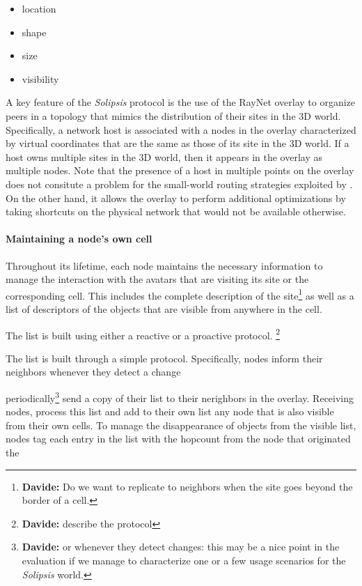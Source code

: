\documentclass{article}
\newcommand{\df}[1]{\footnote{\textbf{Davide: }#1}}
\newcommand{\sol}{\emph{Solipsis}\xspace}
\begin{document}
\begin{itemize}
\item  
location
\item
shape
\item
size
\item
visibility
\end{itemize}



A key feature of the \sol protocol is the use of the RayNet overlay to
organize peers in a topology that mimics the distribution of their
sites in the 3D world. Specifically, a network host is associated
with a nodes in the \ray overlay characterized by virtual coordinates
that are the same as those of its site in the 3D world. If a host owns
multiple sites in the 3D world, then it appears in the \ray overlay as
multiple nodes. Note that the presence of a host in multiple points on
the overlay does not consitute a problem for the small-world routing
strategies exploited by \ray. On the other hand, it allows the overlay
to perform additional optimizations by taking shortcuts on the
physical network that would not be available otherwise. 

\paragraph{Maintaining a node's own cell}
Throughout its lifetime, each node maintains the necessary information
to manage the interaction with the avatars that are visiting its site
or the corresponding cell.  This includes the complete description of
the site\df{Do we want to replicate to neighbors when the site goes
  beyond the border of a cell.}  as well as a list of descriptors of
the objects that are visible from anywhere in the cell.

The list is built using either a reactive or a proactive protocol.
\df{describe the protocol}

The list is built through a simple protocol. Specifically, nodes
inform their neighbors whenever they detect a change 



periodically\df{or whenever they detect changes: this may be a nice
  point in the evaluation if we manage to characterize one or a few
  usage scenarios for the \sol world.} send a copy of their list to
their nerighbors in the \ray overlay. Receiving nodes, process this
list and add to their own list any node that is also visible from
their own cells.  To manage the disappearance of objects from the
visible list, nodes tag each entry in the list with the hopcount from
the node that originated the 
\end{document}
